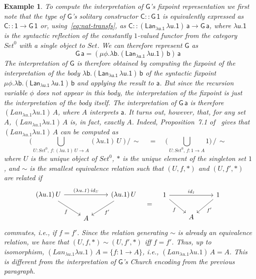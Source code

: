 \documentclass[submission,copyright,creativecommons]{eptcs}
\newtheorem{example}[thm]{Example}
\newcommand{\set}{\mathsf{Set}}
\begin{document}
\begin{example}
To compute the interpretation of $\mathsf{G}$'s fixpoint
representation we first note that the type of $\mathsf{G}$'s solitary
constructor $\mathsf{C :: G\,1}$ is equivalently expressed as
$\mathsf{C :: 1 \to G\,1}$ or, using~\eqref{eq:nat-transfs}, as
$\mathsf{C :: (Lan_{\lambda u. 1}\,\lambda u. 1)\,a \to G\, a}$, where
$\mathsf{\lambda u. 1}$ is the syntactic reflection of the constantly
$1$-valued functor from the category $\mathit{Set}^0$ with a single
object to $\mathit{Set}$. We can therefore represent $\mathsf{G}$ as
\[\mathsf{G\,a} = \mathsf{(\mu \phi. \lambda b.
 (Lan_{\lambda u. 1} \,\lambda u.  1)\,b)\,a}\] The interpretation of
$\mathsf{G}$ is therefore obtained by computing the fixpoint of the
interpretation of the body $\mathsf{\lambda b. (Lan_{\lambda u. 1}
  \,\lambda u. 1)\,b}$ of the syntactic fixpoint $\mathsf{\mu
  \phi. \lambda b.  (Lan_{\lambda u. 1} \,\lambda u.  1)\,b}$ and
applying the result to $\mathsf{a}$. But since the recursion variable
$\mathsf{\phi}$ does not appear in this body, the interpretation of
the fixpoint is just the interpretation of the body itself.  The
interpretation of $\mathsf{G\,a}$ is therefore $(\mathit{Lan}_{\lambda
  u. 1} \lambda u. 1)\, A$, where $A$ interprets $\mathsf{a}$.
It turns out, however, that, for any set $A$, $(\mathit{Lan}_{\lambda
  u. 1} \lambda u. 1)\,A$ is, in fact, exactly $A$. Indeed,
Proposition~7.1 of~\cite{blw03} gives that $(\mathit{Lan}_{\lambda
  u. 1} \lambda u. 1)\,A$ can be computed as
\[\big( \bigcup_{U : \mathit{Set}^0,\,f: (\lambda u.\,1)\,U \to A} (\lambda
u. 1)\,U \;\big) \,/\,\sim
\;\;\;\;=\;\;\;\;
\big( \bigcup_{U :
  \mathit{Set}^0,\,f: 1 \to A} 1 \big)\,/\,\sim\]
where $U$ is the unique object of $\mathit{Set}^0$, $*$ is the unique
element of the singleton set $1$, and $\sim$ is the smallest
equivalence relation such that $(U,f, *)$ and $(U,f',*)$ are related
if
\[
\begin{tikzcd}
(\lambda u.1)\,U \ar[rr, "{\mathit{(\lambda u. 1)\,id_U}}"] \ar[dr, "f"']
&& (\lambda u.1)\,U \ar[dl, "f'"] \\
&A
\end{tikzcd} \;\;\; =\;\;\;
\begin{tikzcd}
1 \ar[rr, "{\mathit{id_1}}"] \ar[dr, "f"']
&&1 \ar[dl, "f'"] \\
&A
\end{tikzcd}
\]
commutes, i.e., if $f = f'$. Since the relation generating $\sim$ is
already an equivalence relation, we have that $(U,f,*) \sim (U,f', *)$
iff $f = f'$. Thus, up to isomorphism, $(\mathit{Lan}_{\lambda u. 1}
\lambda u. 1)\,A = \{ f : 1 \to A\}$, i.e., $(\mathit{Lan}_{\lambda
  u. 1} \lambda u. 1)\,A = A$. This is different from the
interpretation of $\mathsf{G}$'s Church encoding from the previous
paragraph.


\end{example}
\end{document}
